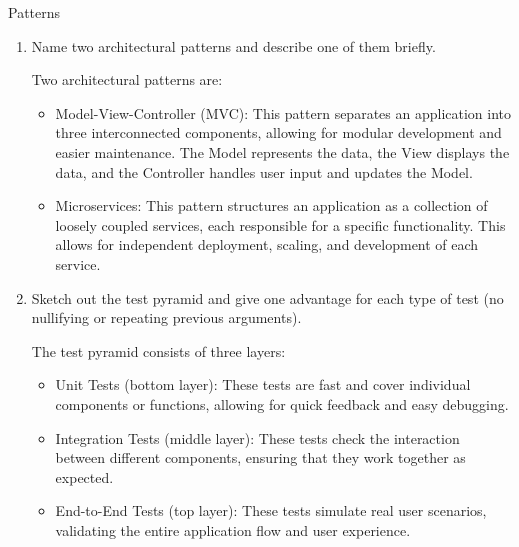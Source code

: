 \documentclass{article}
\begin{document}
\begin{exercise}{Patterns}
  \begin{enumerate}
    \item Name two architectural patterns and describe one of them briefly. \begin{solution}
        Two architectural patterns are:
        \begin{itemize}
          \item Model-View-Controller (MVC): This pattern separates an application into three interconnected components, allowing for modular development and easier maintenance. The Model represents the data, the View displays the data, and the Controller handles user input and updates the Model.
          \item Microservices: This pattern structures an application as a collection of loosely coupled services, each responsible for a specific functionality. This allows for independent deployment, scaling, and development of each service.
        \end{itemize}
      \end{solution}

    \item Sketch out the test pyramid and give one advantage for each type of test (no nullifying or repeating previous arguments). \begin{solution}
        The test pyramid consists of three layers:
        \begin{itemize}
          \item Unit Tests (bottom layer): These tests are fast and cover individual components or functions, allowing for quick feedback and easy debugging.
          \item Integration Tests (middle layer): These tests check the interaction between different components, ensuring that they work together as expected.
          \item End-to-End Tests (top layer): These tests simulate real user scenarios, validating the entire application flow and user experience.
        \end{itemize}
      \end{solution}


\end{enumerate}
\end{exercise}
\end{document}
